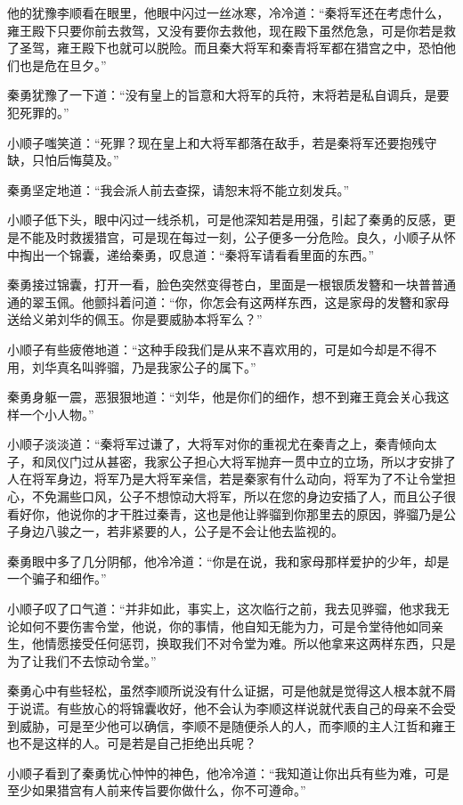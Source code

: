 他的犹豫李顺看在眼里，他眼中闪过一丝冰寒，冷冷道：“秦将军还在考虑什么，雍王殿下只要你前去救驾，又没有要你去救他，现在殿下虽然危急，可是你若是救了圣驾，雍王殿下也就可以脱险。而且秦大将军和秦青将军都在猎宫之中，恐怕他们也是危在旦夕。”

秦勇犹豫了一下道：“没有皇上的旨意和大将军的兵符，末将若是私自调兵，是要犯死罪的。”

小顺子嗤笑道：“死罪？现在皇上和大将军都落在敌手，若是秦将军还要抱残守缺，只怕后悔莫及。”

秦勇坚定地道：“我会派人前去查探，请恕末将不能立刻发兵。”

小顺子低下头，眼中闪过一线杀机，可是他深知若是用强，引起了秦勇的反感，更是不能及时救援猎宫，可是现在每过一刻，公子便多一分危险。良久，小顺子从怀中掏出一个锦囊，递给秦勇，叹息道：“秦将军请看看里面的东西。”

秦勇接过锦囊，打开一看，脸色突然变得苍白，里面是一根银质发簪和一块普普通通的翠玉佩。他颤抖着问道：“你，你怎会有这两样东西，这是家母的发簪和家母送给义弟刘华的佩玉。你是要威胁本将军么？”

小顺子有些疲倦地道：“这种手段我们是从来不喜欢用的，可是如今却是不得不用，刘华真名叫骅骝，乃是我家公子的属下。”

秦勇身躯一震，恶狠狠地道：“刘华，他是你们的细作，想不到雍王竟会关心我这样一个小人物。”

小顺子淡淡道：“秦将军过谦了，大将军对你的重视尤在秦青之上，秦青倾向太子，和凤仪门过从甚密，我家公子担心大将军抛弃一贯中立的立场，所以才安排了人在将军身边，将军乃是大将军亲信，若是秦家有什么动向，将军为了不让令堂担心，不免漏些口风，公子不想惊动大将军，所以在您的身边安插了人，而且公子很看好你，他说你的才干胜过秦青，这也是他让骅骝到你那里去的原因，骅骝乃是公子身边八骏之一，若非紧要的人，公子是不会让他去监视的。

秦勇眼中多了几分阴郁，他冷冷道：“你是在说，我和家母那样爱护的少年，却是一个骗子和细作。”

小顺子叹了口气道：“并非如此，事实上，这次临行之前，我去见骅骝，他求我无论如何不要伤害令堂，他说，你的事情，他自知无能为力，可是令堂待他如同亲生，他情愿接受任何惩罚，换取我们不对令堂为难。所以他拿来这两样东西，只是为了让我们不去惊动令堂。”

秦勇心中有些轻松，虽然李顺所说没有什么证据，可是他就是觉得这人根本就不屑于说谎。有些放心的将锦囊收好，他不会认为李顺这样说就代表自己的母亲不会受到威胁，可是至少他可以确信，李顺不是随便杀人的人，而李顺的主人江哲和雍王也不是这样的人。可是若是自己拒绝出兵呢？

小顺子看到了秦勇忧心忡忡的神色，他冷冷道：“我知道让你出兵有些为难，可是至少如果猎宫有人前来传旨要你做什么，你不可遵命。”

